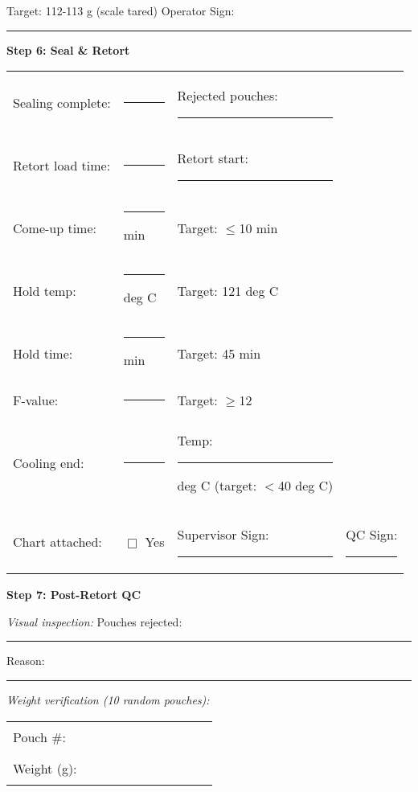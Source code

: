 \noindent Target: 112-113 g (scale tared) \hspace{2cm} Operator Sign: \rule{3cm}{0.4pt}

\vspace{1em}

\noindent\textbf{Step 6: Seal \& Retort}

\begin{tabular}{@{}lp{3cm}p{3cm}p{3cm}@{}}
Sealing complete: & \rule{2.5cm}{0.4pt} & Rejected pouches: \rule{2cm}{0.4pt} & \\
Retort load time: & \rule{2.5cm}{0.4pt} & Retort start: \rule{2.5cm}{0.4pt} & \\
Come-up time: & \rule{2.5cm}{0.4pt} min & Target: $\le$10 min & \\
Hold temp: & \rule{2.5cm}{0.4pt} deg C & Target: 121 deg C & \\
Hold time: & \rule{2.5cm}{0.4pt} min & Target: 45 min & \\
F-value: & \rule{2.5cm}{0.4pt} & Target: $\ge$12 & \\
Cooling end: & \rule{2.5cm}{0.4pt} & Temp: \rule{2cm}{0.4pt} deg C (target: $<$40 deg C) & \\
Chart attached: & $\Box$ Yes & Supervisor Sign: \rule{2.5cm}{0.4pt} & QC Sign: \rule{2.5cm}{0.4pt} \\
\end{tabular}

\vspace{1em}

\noindent\textbf{Step 7: Post-Retort QC}

\noindent\textit{Visual inspection:} Pouches rejected: \rule{2cm}{0.4pt} \hspace{1cm} Reason: \rule{6cm}{0.4pt}

\vspace{0.5em}

\noindent\textit{Weight verification (10 random pouches):}

\begin{tabular}{@{}lcccccccccc@{}}
Pouch \#: & \rule{1cm}{0.4pt} & \rule{1cm}{0.4pt} & \rule{1cm}{0.4pt} & \rule{1cm}{0.4pt} & \rule{1cm}{0.4pt} & \rule{1cm}{0.4pt} & \rule{1cm}{0.4pt} & \rule{1cm}{0.4pt} & \rule{1cm}{0.4pt} & \rule{1cm}{0.4pt} \\
Weight (g): & \rule{1cm}{0.4pt} & \rule{1cm}{0.4pt} & \rule{1cm}{0.4pt} & \rule{1cm}{0.4pt} & \rule{1cm}{0.4pt} & \rule{1cm}{0.4pt} & \rule{1cm}{0.4pt} & \rule{1cm}{0.4pt} & \rule{1cm}{0.4pt} & \rule{1cm}{0.4pt} \\
\end{tabular}

